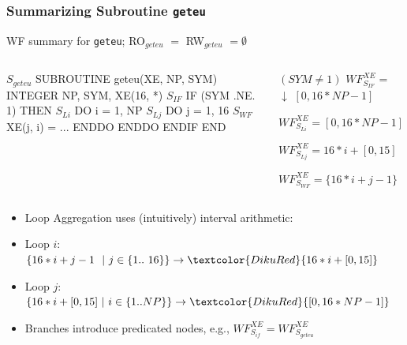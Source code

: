\documentclass{beamer}
\renewcommand{\emph}[1]{\textcolor{structure}{#1}}
\newcommand{\emp}[1]{\textcolor{DikuRed}{ #1}}
\newcommand{\mymath}[1]{$ #1 $}
\newcommand{\myindx}[1]{_{#1}}
\newcommand{\myindu}[1]{^{#1}}
\begin{document}
\begin{frame}[fragile,t]
  \frametitle{Summarizing Subroutine {\tt geteu}}

\begin{block}{WF summary for {\tt geteu}; RO$_{geteu}$ $=$ RW$_{geteu}$ $= \emptyset$ } \vspace{-1ex}
\begin{columns} 
\begin{colorcode}[fontsize=\scriptsize]
\mymath{S\myindx{geteu}}  SUBROUTINE geteu(XE, NP, SYM)
         INTEGER NP, SYM, XE(16, *)  
\mymath{S\myindx{IF}}       \emph{IF (SYM .NE. 1) THEN}
\mymath{S\myindx{Li}}         \emp{DO i = 1, NP}
\mymath{S\myindx{Lj}}           \emp{DO j = 1, 16}
\mymath{S\myindx{WF}}             \alert{XE(j, i)} = ...
             \emp{ENDDO} 
           \emp{ENDDO}
         \emph{ENDIF}
       END
\end{colorcode}
\begin{colorcode}[fontsize=\scriptsize]
          \emph{\mymath{(SYM \neq 1)}}
\emph{\mymath{WF\myindu{XE}\myindx{S\myindx{IF}} =}       \mymath{\downarrow}}
          \emph{\mymath{[0,16*NP-1]}}

\emp{\mymath{WF\myindu{XE}\myindx{S\myindx{Li}} = [0,16*NP-1]}}

\emp{\mymath{WF\myindu{XE}\myindx{S\myindx{Lj}} = 16*i + [0,15]}}

\alert{\mymath{WF\myindu{XE}\myindx{S\myindx{WF}} = \{16*i+j-1\}}}
\end{colorcode}
\end{columns}
\end{block}


\begin{itemize}
    \item Loop Aggregation uses (intuitively) interval arithmetic: \smallskip
    \item Loop $i$: $\{16*i + j - 1 \mbox{ }\mbox{ }|\mbox{ } j \in \{1..\mbox{ }16\}\} \rightarrow \emp{16*i + [0,15]}$ \smallskip
    \item Loop $j$: $\{16*i + [0,15] \mbox{ }|\mbox{ } i \in \{1..NP\}\} \rightarrow \emp{[0, 16*NP-1]}$  \smallskip
    \item Branches introduce predicated nodes, e.g., \emph{$WF^{XE}_{S_{if}} = WF^{XE}_{S_{geteu}}$} 
\end{itemize}
\end{frame}


\end{document}
